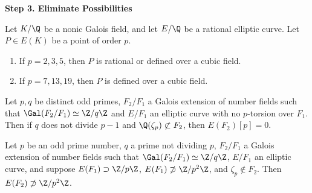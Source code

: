 \begin{frame}[plain]
\vfill
\begin{center} {\bfseries \Large \textcolor{UniGray}{Step 3. Eliminate Possibilities}} \end{center}
\vfill 
\end{frame}


%
%
%
%
%
%
%
%
%
%
%



\begin{frame}[plain]
\begin{lem}
Let $K/\Q$ be a nonic Galois field, and let $E/\Q$ be a rational elliptic curve. Let $P \in E(K)$ be a point of order $p$. 
	\begin{enumerate}
	\item If $p= 2,3,5$, then $P$ is rational or defined over a cubic field.
	\item If $p= 7, 13, 19$, then $P$ is defined over a cubic field.
	\end{enumerate}
\end{lem}
\end{frame}



\begin{frame}[plain]
\begin{lem}[Najman]
Let $p, q$ be distinct odd primes, $F_2/F_1$ a Galois extension of number fields such that $\Gal(F_2/F_1) \simeq \Z/q\Z$ and $E/F_1$ an elliptic curve with no $p$-torsion over $F_1$. Then if $q$ does not divide $p-1$ and $\Q(\zeta_p) \not\subset F_2$, then $E(F_2)[p]=0$. 
\end{lem}

\begin{lem}[Najman]
Let $p$ be an odd prime number, $q$ a prime not dividing $p$, $F_2/F_1$ a Galois extension of number fields such that $\Gal(F_2/F_1) \simeq \Z/q\Z$, $E/F_1$ an elliptic curve, and suppose $E(F_1) \supset \Z/p\Z$, $E(F_1) \not\supset \Z/p^2\Z$, and $\zeta_p \notin F_2$. Then $E(F_2) \not\supset \Z/p^2\Z$.
\end{lem}
\end{frame}



